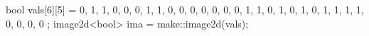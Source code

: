 bool vals[6][5] = {
{0, 1, 1, 0, 0},
{0, 1, 1, 0, 0},
{0, 0, 0, 0, 0},
{1, 1, 0, 1, 0},
{1, 0, 1, 1, 1},
{1, 0, 0, 0, 0}
};
image2d<bool> ima = make::image2d(vals);
